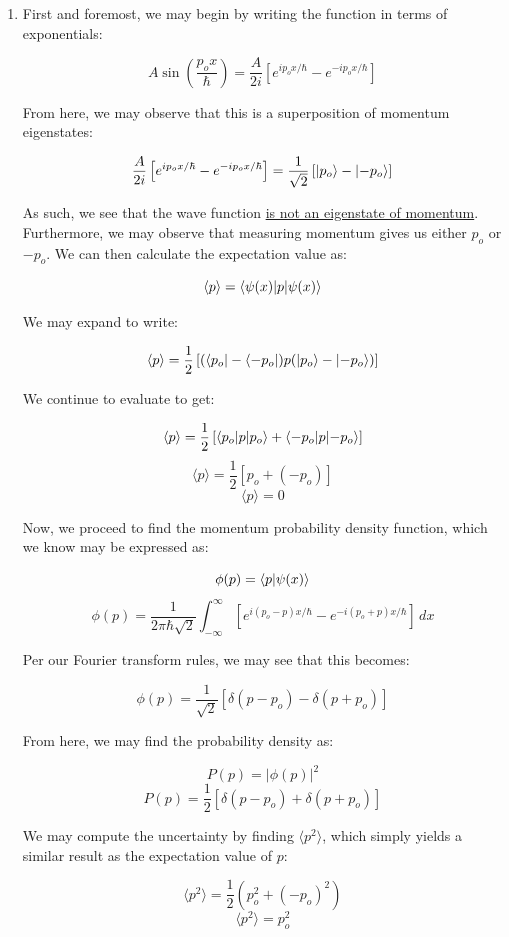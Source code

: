 \begin{enumerate}

  \item First and foremost, we may begin by writing the function in terms of exponentials:

    $$A\sin\left( \frac{p_ox}{\hbar} \right)=\frac{A}{2i}\left[ e^{ip_ox/\hbar}-e^{-ip_ox/\hbar} \right]$$

    From here, we may observe that this is a superposition of momentum eigenstates:

    $$\frac{A}{2i}\left[ e^{ip_ox/\hbar}-e^{-ip_ox/\hbar} \right]=\frac{1}{\sqrt{2}}\left[ \ket{p_o}-\ket{-p_o} \right]$$

    As such, we see that the wave function \underline{is not an eigenstate of momentum}. Furthermore, we may observe that measuring momentum gives us either $p_o$ or $-p_o$. We can then calculate the expectation value as:

    $$\langle p\rangle = \bra{\psi(x)|p}\ket{\psi(x)}$$

    We may expand to write:

    $$\langle p\rangle = \frac{1}{2}\left[ (\bra{p_o}-\bra{-p_o})p(\ket{p_o}-\ket{-p_o}) \right]$$

    We continue to evaluate to get:

    $$\langle p\rangle = \frac{1}{2}\left[ \bra{p_o|p}\ket{p_o}+\bra{-p_o|p}\ket{-p_o} \right]$$
    $$\langle p\rangle = \frac{1}{2}\left[ p_o+(-p_o) \right]$$
    $$\boxed{\langle p\rangle = 0}$$

    Now, we proceed to find the momentum probability density function, which we know may be expressed as:

    $$\phi(p)=\bra{p}\ket{\psi(x)}$$
    $$\phi(p)=\frac{1}{2\pi\hbar\sqrt{2}}\int_{-\infty}^{\infty}\left[ e^{i(p_o-p)x/\hbar}-e^{-i(p_o+p)x/\hbar} \right]\,dx$$

    Per our Fourier transform rules, we may see that this becomes:

    $$\boxed{\phi(p)=\frac{1}{\sqrt{2}}\left[ \delta(p-p_o)-\delta(p+p_o) \right]}$$

    From here, we may find the probability density as:

    $$P(p)=|\phi(p)|^2$$
    $$\boxed{P(p)=\frac{1}{2}\left[ \delta(p-p_o)+\delta(p+p_o) \right]}$$

    We may compute the uncertainty by finding $\langle p^2\rangle$, which simply yields a similar result as the expectation value of $p$:

    $$\langle p^2\rangle=\frac{1}{2}\left( p_o^2+(-p_o)^2 \right)$$
    $$\boxed{\langle p^2\rangle=p_o^2}$$


\end{enumerate}
